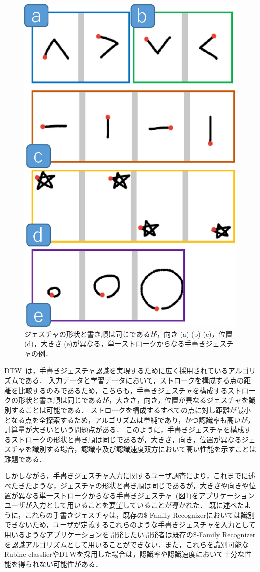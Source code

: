 \begin{figure} [htbp]
\centering
\includegraphics [width=0.5\columnwidth]{img/examples_V.eps}
\caption{ジェスチャの形状と書き順は同じであるが，向き (a) (b) (c)，位置 (d)，大きさ (e)が異なる，単一ストロークからなる手書きジェスチャの例．}
\label{fig:examples_V}
\end{figure}

DTW~\cite{Tappert:1982:CSR:1664966.1664979, Salvador:2007:TAD:1367985.1367993}は，手書きジェスチャ認識を実現するために広く採用されているアルゴリズムである．
入力データと学習データにおいて，ストロークを構成する点の距離を比較するのみであるため，こちらも，手書きジェスチャを構成するストロークの形状と書き順は同じであるが，大きさ，向き，位置が異なるジェスチャを識別することは可能である．
ストロークを構成するすべての点に対し距離が最小となる点を全探索するため，アルゴリズムは単純であり，かつ認識率も高いが，計算量が大きいという問題点がある．
このように，手書きジェスチャを構成するストロークの形状と書き順は同じであるが，大きさ，向き，位置が異なるジェスチャを識別する場合，認識率及び認識速度双方において高い性能を示すことは難題である．

しかしながら，手書きジェスチャ入力に関するユーザ調査により，これまでに述べたきたような，ジェスチャの形状と書き順は同じであるが，大きさや向きや位置が異なる単一ストロークからなる手書きジェスチャ~(図\ref{fig:examples_V})をアプリケーションユーザが入力として用いることを要望していることが導かれた．
既に述べたように，これらの手書きジェスチャは，既存の\$-Family Recognizerにおいては識別できないため，ユーザが定義するこれらのような手書きジェスチャを入力として用いるようなアプリケーションを開発したい開発者は既存の\$-Family Recognizerを認識アルゴリズムとして用いることができない．また，これらを識別可能なRubine classfierやDTWを採用した場合は，認識率や認識速度において十分な性能を得られない可能性がある．


